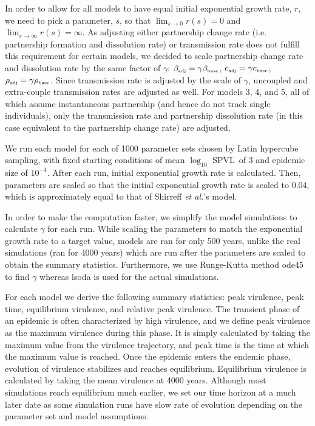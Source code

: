 \documentclass[10pt,letterpaper]{article}
\newcommand{\Lspvl}{$\log_{10}$ SPVL}
\newcommand{\etal}{\textit{et al.}}
\newcommand{\tsub}[2]{#1_{{\textrm{\tiny #2}}}}
\begin{document}
In order to allow for all models to have equal initial exponential growth rate, $r$, we need to pick a parameter, $s$, so that $\lim_{s\to 0} r(s) = 0$ and $\lim_{s\to\infty}  r(s) = \infty$. As adjusting either partnership change rate (i.e. partnership formation and dissolution rate) or transmission rate does not fulfill this requirement for certain models, we decided to scale partnership change rate and dissolution rate by the same factor of $\gamma$: $\tsub{\beta}{adj} =  \gamma \tsub{\beta}{base}$, $\tsub{c}{adj} = \gamma \tsub{c}{base}$, $\tsub{\rho}{adj} = \gamma \tsub{\rho}{base}$. Since transmission rate is adjusted by the scale of $\gamma$, uncoupled and extra-couple transmission rates are adjusted as well. For models 3, 4, and 5, all of which assume instantaneous partnership (and hence do not track single individuals), only the transmission rate and partnership dissolution rate (in this case equivalent to the partnership change rate) are adjusted.

We run each model for each of 1000 parameter sets chosen by Latin hypercube sampling, with fixed starting conditions
of mean \Lspvl\ of 3 and epidemic size of $10^{-4}$. After each run, initial exponential growth rate is calculated. Then, parameters are scaled so that the initial exponential growth rate is scaled to 0.04, which is approximately equal to that of Shirreff \etal's model.

In order to make the computation faster, we simplify the model simulations to calculate $\gamma$ for each run. While scaling the parameters to match the exponential growth rate to a target value, models are ran for only 500 years, unlike the real simulations (ran for 4000 years) which are run after the parameters are scaled to obtain the summary statistics. Furthermore, we use Runge-Kutta method ode45 to find $\gamma$ whereas lsoda is used for the actual simulations.

For each model we derive the following summary statistics: peak virulence, peak time, equilibrium virulence, and relative peak virulence. The transient phase of an epidemic is often characterized by high virulence, and we define peak virulence as the maximum virulence during this phase. It is simply calculated by taking the maximum value from the virulence trajectory, and peak time is the time at which the maximum value is reached. Once the epidemic enters the endemic phase, evolution of virulence stabilizes and reaches equilibrium. Equilibrium virulence is calculated by taking the mean virulence at 4000 years. Although most simulations reach equilibrium much earlier, we set our time horizon at a much later date as some simulation runs have slow rate of evolution depending on the parameter set and model assumptions.
\end{document}
